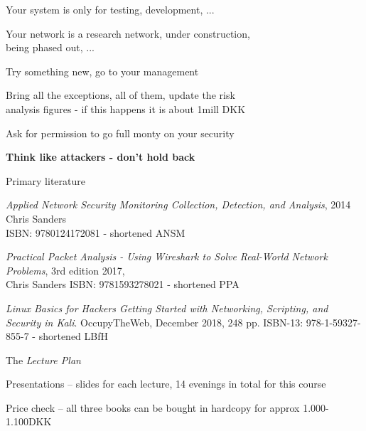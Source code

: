 \documentclass[Screen16to9,17pt]{foils}
\begin{document}

Your system is only for testing, development, ...

Your network is a research network, under construction, \\
being phased out, ...

Try something new, go to your management

Bring all the exceptions, all of them, update the risk \\
analysis figures - if this happens it is about 1mill DKK

Ask for permission to go full monty on your security

{\bf Think like attackers - don't hold back}




\myquestionspage




Primary literature
\begin{list2}
\item \emph{Applied Network Security Monitoring Collection, Detection, and Analysis}, 2014 Chris Sanders \\
ISBN: 9780124172081 - shortened ANSM
\item \emph{Practical Packet Analysis - Using Wireshark to Solve Real-World Network Problems}, 3rd edition 2017, \\
Chris Sanders ISBN: 9781593278021 - shortened PPA
\item \emph{Linux Basics for Hackers Getting Started with Networking, Scripting, and Security in Kali}. OccupyTheWeb, December 2018, 248 pp. ISBN-13: 978-1-59327-855-7 - shortened LBfH
\item The \emph{Lecture Plan}\\
\item Presentations -- slides for each lecture, 14 evenings in total for this course\\{\footnotesize
{}}
\end{list2}

Price check -- all three books can be bought in hardcopy for approx 1.000-1.100DKK


\end{document}
